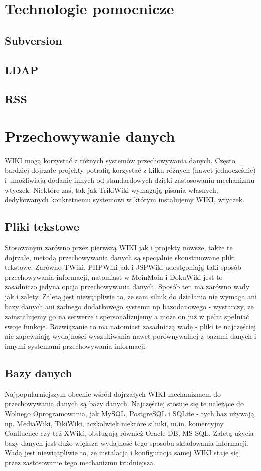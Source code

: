 \documentclass{article}
\begin{document}
\newpage
\section{Technologie pomocnicze}
	\subsection{Subversion}
	\subsection{LDAP}
	\subsection{RSS}
\newpage
\section{Przechowywanie danych}
	WIKI mogą korzystać z różnych systemów przechowywania danych. Często bardziej dojrzałe projekty potrafią korzystać z kilku różnych (nawet jednocześnie) i umożliwiają dodanie innych od standardowych dzięki zastosowaniu mechanizmu wtyczek. Niektóre zaś, tak jak TrikiWiki wymagają pisania własnych, dedykowanych konkretnemu systemowi w którym instalujemy WIKI, wtyczek. 
	\subsection{Pliki tekstowe}
	Stosowanym zarówno przez pierwszą WIKI jak i projekty nowsze, także te dojrzałe, metodą przechowywania danych są specjalnie skonstruowane pliki tekstowe. Zarówno TWiki, PHPWiki jak i JSPWiki udostępniają taki sposób przechowywania informacji, natomiast w MoinMoin i DokuWiki jest to zasadniczo jedyna opcja przechowywania danych. Sposób ten ma zarówno wady jak i zalety. Zaletą jest niewątpliwie to, że sam silnik do działania nie wymaga ani bazy danych ani żadnego dodatkowego systemu np bazodanowego - wystarczy, że zainstalujemy go na serwerze i spersonalizujemy a może on już w pełni spełniać swoje funkcje. Rozwiązanie to ma natomiast zasadniczą wadę - pliki te najczęściej nie zapewniają wydajności wyszukiwania nawet porównywalnej z bazami danych i innymi systemami przechowywania informacji. 
	\subsection{Bazy danych}
	Najpopularniejszym obecnie wśród dojrzałych WIKI mechanizmem do przechowywania danych są bazy danych. Najczęściej stosuje się te należące do Wolnego Oprogramowania, jak MySQL, PostgreSQL i SQLite - tych baz używają np. MediaWiki, TikiWiki, aczkolwiek niektóre silniki, m.in. komercyjny Confluence czy też XWiki, obsługują również Oracle DB, MS SQL. Zaletą użycia bazy danych jest dużo większa wydajność tego sposobu składowania informacji. Wadą jest niewiątpliwie to, że instalacja i konfiguracja samej WIKI staje się przez zastosowanie tego mechanizmu trudniejsza.
\end{document}
